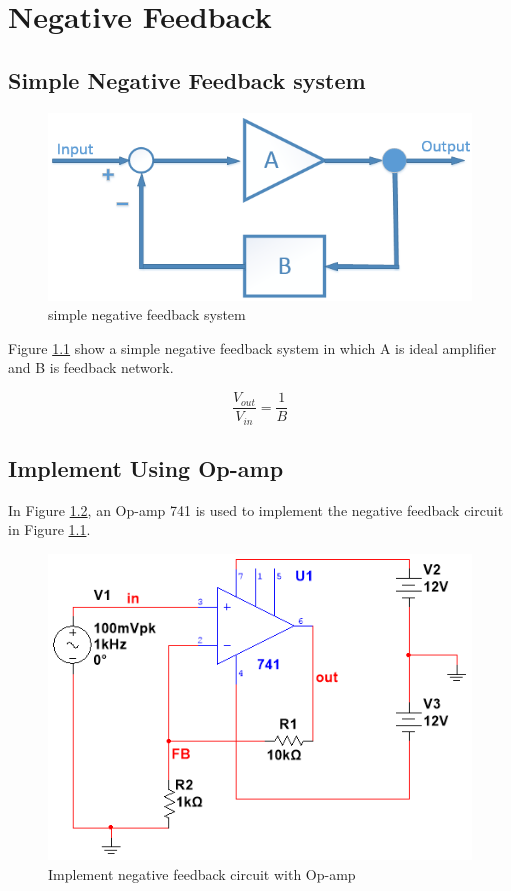 \chapter{Negative Feedback}
\section{Simple Negative Feedback system}

\begin{figure}[htbp]
	\centering
	\includegraphics[scale=0.7]{"../Photo/Chap2/Feedback system"}
	\caption{simple negative feedback system}
	\label{fig:Feedback system}
\end{figure}

Figure \ref{fig:Feedback system} show a simple negative feedback system in which A is ideal amplifier and B is feedback network. 

\[  \frac{V_{out}}{V_{in}} = \frac{1}{B}  \] 
 



\section{Implement Using Op-amp}

In Figure \ref{fig:Op-amp feedback}, an Op-amp 741 is used to implement the negative feedback circuit in Figure \ref{fig:Feedback system}.

\begin{figure}[htbp]
	\centering
	\includegraphics[scale=0.7]{"../Photo/Chap2/Op-amp feedback"}
	\caption{Implement negative feedback circuit with Op-amp}
	\label{fig:Op-amp feedback}
\end{figure}




